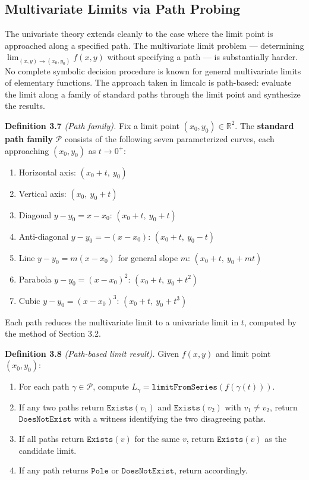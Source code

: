 \documentclass[12pt]{article}
\providecommand{\tightlist}{\setlength{\itemsep}{0pt}\setlength{\parskip}{0pt}}
\begin{document}
\subsection{Multivariate Limits via Path
Probing}\label{multivariate-limits-via-path-probing}

The univariate theory extends cleanly to the case where the limit point
is approached along a specified path. The multivariate limit problem ---
determining \(\lim_{(x,y) \to (x_0, y_0)} f(x,y)\) without specifying a
path --- is substantially harder. No complete symbolic decision
procedure is known for general multivariate limits of elementary
functions. The approach taken in limcalc is path-based: evaluate the
limit along a family of standard paths through the limit point and
synthesize the results.

\textbf{Definition 3.7} \emph{(Path family).} Fix a limit point
\((x_0, y_0) \in \mathbb{R}^2\). The \textbf{standard path family}
\(\mathcal{P}\) consists of the following seven parameterized curves,
each approaching \((x_0, y_0)\) as \(t \to 0^+\):

\begin{enumerate}
\def\labelenumi{\arabic{enumi}.}
\tightlist
\item
  Horizontal axis: \((x_0 + t,\ y_0)\)
\item
  Vertical axis: \((x_0,\ y_0 + t)\)
\item
  Diagonal \(y - y_0 = x - x_0\): \((x_0 + t,\ y_0 + t)\)
\item
  Anti-diagonal \(y - y_0 = -(x - x_0)\): \((x_0 + t,\ y_0 - t)\)
\item
  Line \(y - y_0 = m(x - x_0)\) for general slope \(m\):
  \((x_0 + t,\ y_0 + mt)\)
\item
  Parabola \(y - y_0 = (x - x_0)^2\): \((x_0 + t,\ y_0 + t^2)\)
\item
  Cubic \(y - y_0 = (x - x_0)^3\): \((x_0 + t,\ y_0 + t^3)\)
\end{enumerate}

Each path reduces the multivariate limit to a univariate limit in \(t\),
computed by the method of Section 3.2.

\textbf{Definition 3.8} \emph{(Path-based limit result).} Given
\(f(x,y)\) and limit point \((x_0, y_0)\):

\begin{enumerate}
\def\labelenumi{\arabic{enumi}.}
\tightlist
\item
  For each path \(\gamma \in \mathcal{P}\), compute
  \(L_\gamma = \mathtt{limitFromSeries}(f(\gamma(t)))\).
\item
  If any two paths return \(\mathtt{Exists}(v_1)\) and
  \(\mathtt{Exists}(v_2)\) with \(v_1 \neq v_2\), return
  \(\mathtt{DoesNotExist}\) with a witness identifying the two
  disagreeing paths.
\item
  If all paths return \(\mathtt{Exists}(v)\) for the same \(v\), return
  \(\mathtt{Exists}(v)\) as the candidate limit.
\item
  If any path returns \(\mathtt{Pole}\) or \(\mathtt{DoesNotExist}\),
  return accordingly.
\end{enumerate}
\end{document}
